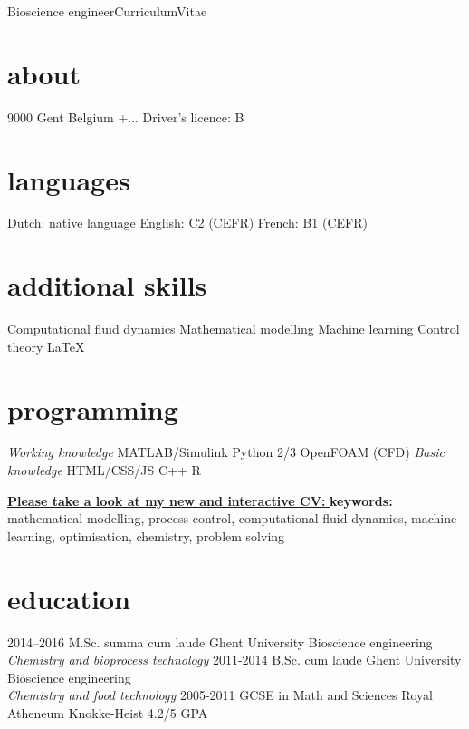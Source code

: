 \documentclass[]{friggeri-cv}
\begin{document}
       {Bioscience engineer}{Curriculum}{Vitae}
 \begin{aside}
  \vspace{0.7cm}\section{about}
    9000 Gent
    Belgium \vspace{0.21cm}
    +...
     \vspace{0.21cm}
    Driver's licence: B \vspace{-1.25mm}
  \section{languages}
    Dutch: native language
    English: C2 (CEFR)
    French:  B1  (CEFR) \vspace{3.3mm}
  \section{additional skills}
  Computational fluid dynamics
  Mathematical modelling
  Machine learning
  Control theory 
  LaTeX \vspace{3.3mm}
  \section{programming} 
  \textit{Working knowledge}
  MATLAB/Simulink
  Python 2/3
  OpenFOAM (CFD) \vspace{0.15cm}
  \textit{Basic knowledge}
  HTML/CSS/JS
  C++
  R
\end{aside}
\hspace{-6cm} \href{http://bramdejaegher.be/CV.html}{\textbf{Please take a look at my new and interactive CV:} }
\vspace{3mm}
\textbf{keywords:} mathematical modelling, process control, computational fluid dynamics, machine learning, optimisation, chemistry, problem solving
\vspace{3mm}

\section{education}
\begin{entrylist}
    \entry
    {2014–2016}
    {M.Sc. summa cum laude}
    {Ghent University}
    {Bioscience engineering\\
    \emph{Chemistry and bioprocess technology}}
  \entry
    {2011-2014}
    {B.Sc. cum laude}
    {Ghent University}
    {Bioscience engineering\\
    \emph{Chemistry and food technology}}
  \entry
    {2005-2011}
    {GCSE in Math and Sciences}
    {Royal Atheneum Knokke-Heist}
    {4.2/5 GPA}
\end{entrylist}
\end{document}
